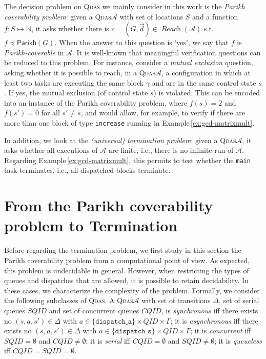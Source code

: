 \documentclass[runningheads,oribibl,]{article}
\newcommand{\mleq}{\preceq}
\newcommand{\Aa}{\ensuremath{\mathcal{A}}\xspace}
\newcommand{\NN}{\ensuremath{\mathbb{N}}\xspace}
\newcommand{\cfont}[1]{\ensuremath{\mathtt{#1}}\xspace}
\newcommand{\CQID}{CQID\xspace}
\newcommand{\SQID}{SQID\xspace}
\newcommand{\QID}{QID\xspace}
\newcommand{\qdas}{\textsc{Qdas}\xspace}
\DeclareMathOperator{\Reach}{\textit{Reach}}
\newcommand{\Graph}{\ensuremath{G}}
\newcommand{\Data}{\ensuremath{\vec{d}}}
\newcommand{\Parikh}{\ensuremath{\mathsf{Parikh}}}
\begin{document}
 The decision problem on \qdas we mainly consider in this work is the
 \emph{Parikh coverability problem}: given a \qdas $\Aa$ with set of
 locations $S$ and a function $f:S\mapsto \NN$, it asks whether
 there is $c=(\Graph,\Data)\in\Reach(\Aa)$
 s.t. $f\mleq\Parikh(\Graph)$. When the answer to this question is `yes',
 we say that $f$ is \emph{Parikh-coverable} in $\Aa$. It is well-known
 that meaningful verification questions can be reduced to this
 problem. For instance, consider a \emph{mutual exclusion} question,
 asking whether it is possible to reach, in a \qdas $\Aa$, a
 configuration in which at least two tasks are executing the same
 block $\gamma$ and are in the same control state $s$. If yes, the
 mutual exclusion (of control state $s$) is violated. This can be
 encoded into an instance of the Parikh coverability problem, where
 $f(s)=2$ and $f(s')=0$ for all $s'\neq s$, and would allow,
 for example, to verify if there are more than one block of type
 \texttt{increase} running in
 Example\,\ref{ex:gcd-matrixmult}.

 In addition, we look at the \emph{(universal) termination problem}:
 given a \qdas $\Aa$, it asks whether all executions of $\Aa$ are
 finite, i.e., there is no infinite run of $\Aa$.
 Regarding Example\,\ref{ex:gcd-matrixmult}, this
 permits to test whether the \texttt{main} task terminates, i.e.,
 all dispatched blocks terminate.



\section{From the Parikh coverability problem to Termination\label{sec:parikh-cover-probl}}

Before regarding the termination problem, we first study
in this section the Parikh coverability problem from a
computational point of view. As expected, this problem is undecidable
in general. However, when restricting the types of queues and
dispatches that are allowed, it is possible to retain decidability. In
these cases, we characterize the complexity of the problem. Formally,
we consider the following subclasses of \qdas. A \qdas $\Aa$ with set
of transitions $\Delta$, set of serial queues $\SQID$ and set of
concurrent queues $\CQID$, is \emph{synchronous} iff there exists no
$(s,a,s')\in\Delta$ with $a\in\{\cfont{dispatch\_a}\}\times \QID
\times \Gamma$; it is \emph{asynchronous} iff there exists no
$(s,a,s')\in\Delta$ with $a\in\{\cfont{dispatch\_s}\}\times \QID
\times \Gamma$; it is \emph{concurrent} iff $\SQID=\emptyset$ and
$\CQID\neq\emptyset$; it is \emph{serial} iff $\CQID=\emptyset$ and
$\SQID\neq\emptyset$; it is \emph{queueless} iff
$\CQID=\SQID=\emptyset$.
\end{document}
